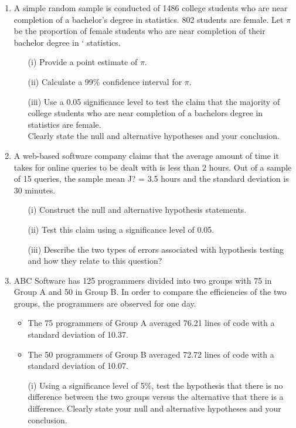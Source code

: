 \documentclass[]{article}
\begin{document}
\begin{enumerate}
\item 
A simple random sample is conducted of 1486 college students who are near completion of a bachelor's degree in statistics. 802 students are female. Let $\pi$ be the proportion of female students who are near completion of their bachelor degree in `
statistics.
\begin{itemize}
	\item[(i)]Provide a point estimate of $\pi$.
	\item[(ii)] Calculate a 99\% confidence interval for $\pi$.
	\item[(iii)]  Use a 0.05 significance level to test the claim that the majority of
	college students who are near completion of a bachelors degree in statistics are
	female. \\ Clearly state the null and alternative hypotheses and your conclusion.\end{itemize}



\item 
A web-based software company claims that the average amount of time it takes for
online queries to be dealt with is less than 2 hours. Out of a sample of 15 queries, the
sample mean J? = 3.5 hours and the standard deviation is 30 minutes.
\begin{itemize}
	\item[(i)] Construct the null and alternative hypothesis statements.
	\item[(ii)] Test this claim using a significance level of 0.05.
	\item[(iii)] Describe the two types of errors associated with hypothesis testing and how
	they relate to this question?
\end{itemize}

\item  ABC Software has 125 programmers divided into two groups with 75 in
Group A and 50 in Group B. In order to compare the efficiencies of the
two groups, the programmers are observed for one day. \begin{itemize} \item The 75
	programmers of Group A averaged 76.21 lines of code with a standard
	deviation of 10.37. \item The 50 programmers of Group B averaged 72.72
	lines of code with a standard deviation of 10.07. \end{itemize}
\begin{itemize}
	\item[(i)] Using a significance
	level of 5\%, test the hypothesis that there is no difference between the
	two groups versus the alternative that there is a difference. Clearly state
	your null and alternative hypotheses and your conclusion.
\end{itemize}


\end{enumerate}
\end{document}
